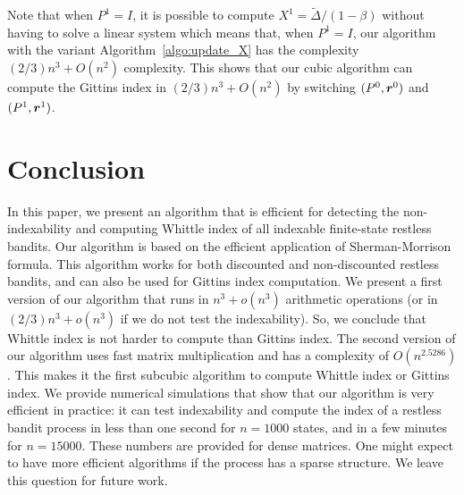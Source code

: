 \documentclass[acmsmall,screen,anonymous]{acmart}
\begin{document}
Note that when $P^1=I$, it is possible to compute $X^1=\tilde{\Delta}/(1-\beta)$ without having to solve a linear system which means that, when $P^1=I$, our algorithm with the variant Algorithm~\ref{algo:update_X} has the complexity $(2/3) n^3 +O(n^2)$ complexity. This shows that our cubic algorithm can compute the Gittins index in $(2/3) n^3 +O(n^2)$ by switching $(P^0,\boldsymbol{r}^0)$ and $(P^1,\boldsymbol{r}^1)$. 





\section{Conclusion}
\label{sec:conclusion}
In this paper, we present an algorithm that is efficient for detecting the non-indexability and computing Whittle index of all indexable finite-state restless bandits. Our algorithm is based on the efficient application of Sherman-Morrison formula. This algorithm works for both discounted and non-discounted restless bandits, and can also be used for Gittins index computation.   We present a first version of our algorithm that runs in $n^3+o(n^3)$ arithmetic operations (or in $(2/3)n^3+o(n^3)$ if we do not test the indexability). So, we conclude that Whittle index is not harder to compute than Gittins index. The second version of our algorithm uses fast matrix multiplication and has a complexity of $O(n^{2.5286})$. This makes it the first subcubic algorithm to compute Whittle index or Gittins index. We provide numerical simulations that show that our algorithm is very efficient in practice: it can test indexability and compute the index of a restless bandit process in less than one second for $n=1000$ states, and in a few minutes for $n=15000$. These numbers are provided for dense matrices. One might expect to have more efficient algorithms if the process has a sparse structure. We leave this question for future work. 
\end{document}
